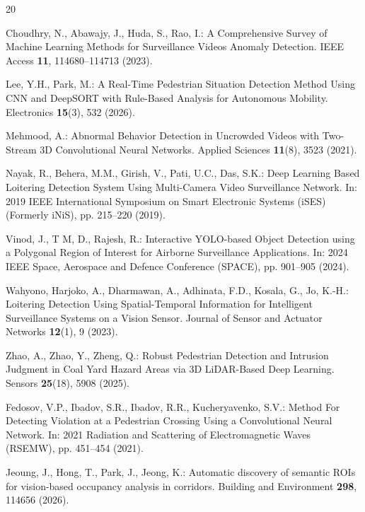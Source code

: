 \documentclass[runningheads]{llncs}
\begin{document}
\begin{thebibliography}{20}

Choudhry, N., Abawajy, J., Huda, S., Rao, I.: A Comprehensive Survey of Machine Learning Methods for Surveillance Videos Anomaly Detection. IEEE Access \textbf{11}, 114680--114713 (2023). 

Lee, Y.H., Park, M.: A Real-Time Pedestrian Situation Detection Method Using CNN and DeepSORT with Rule-Based Analysis for Autonomous Mobility. Electronics \textbf{15}(3), 532 (2026). 

Mehmood, A.: Abnormal Behavior Detection in Uncrowded Videos with Two-Stream 3D Convolutional Neural Networks. Applied Sciences \textbf{11}(8), 3523 (2021). 

Nayak, R., Behera, M.M., Girish, V., Pati, U.C., Das, S.K.: Deep Learning Based Loitering Detection System Using Multi-Camera Video Surveillance Network. In: 2019 IEEE International Symposium on Smart Electronic Systems (iSES) (Formerly iNiS), pp. 215--220 (2019). 

Vinod, J., T M, D., Rajesh, R.: Interactive YOLO-based Object Detection using a Polygonal Region of Interest for Airborne Surveillance Applications. In: 2024 IEEE Space, Aerospace and Defence Conference (SPACE), pp. 901--905 (2024). 

Wahyono, Harjoko, A., Dharmawan, A., Adhinata, F.D., Kosala, G., Jo, K.-H.: Loitering Detection Using Spatial-Temporal Information for Intelligent Surveillance Systems on a Vision Sensor. Journal of Sensor and Actuator Networks \textbf{12}(1), 9 (2023). 

Zhao, A., Zhao, Y., Zheng, Q.: Robust Pedestrian Detection and Intrusion Judgment in Coal Yard Hazard Areas via 3D LiDAR-Based Deep Learning. Sensors \textbf{25}(18), 5908 (2025). 

Fedosov, V.P., Ibadov, S.R., Ibadov, R.R., Kucheryavenko, S.V.: Method For Detecting Violation at a Pedestrian Crossing Using a Convolutional Neural Network. In: 2021 Radiation and Scattering of Electromagnetic Waves (RSEMW), pp. 451--454 (2021). 

Jeoung, J., Hong, T., Park, J., Jeong, K.: Automatic discovery of semantic ROIs for vision-based occupancy analysis in corridors. Building and Environment \textbf{298}, 114656 (2026). 


\end{thebibliography}
\end{document}
